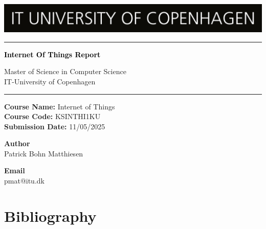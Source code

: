 \documentclass[a4paper,12pt]{article}
\begin{document}

\begin{titlepage}
    \centering
    \includegraphics[width=\textwidth]{pictures//ITU_logo_en.jpg}
        \textcolor{black}{\rule{\linewidth}{1pt}} \par
        {\Huge\bfseries \textcolor{black}{Internet Of Things Report}\par} 
        \vspace{1pt} {Master of Science in Computer Science \\ 
        IT-University of Copenhagen \par}
        \textcolor{black}{\rule{\linewidth}{1pt}} \par
        \vspace*{0.25cm}
    \textbf{Course Name:} Internet of Things\\
    \textbf{Course Code:} KSINTHI1KU\\
    \textbf{Submission Date:} 11/05/2025\\
    
    \vspace*{0.25cm}
    
    \begin{minipage}{0.70\textwidth}
        \begin{flushleft} \large
            \textbf{Author}\\
            Patrick Bohn Matthiesen 
        \end{flushleft}
        \end{minipage}
        \begin{minipage}{0.25\textwidth}
        \begin{flushright} \large
            \textbf{Email}\\
            pmat@itu.dk
        \end{flushright}
    \end{minipage}
\end{titlepage}

\tableofcontents %
\cleardoublepage{} %


\cleardoublepage{}


\cleardoublepage{}


\cleardoublepage{}


\section{Bibliography}
\printbibliography[heading=none]
\end{document}
